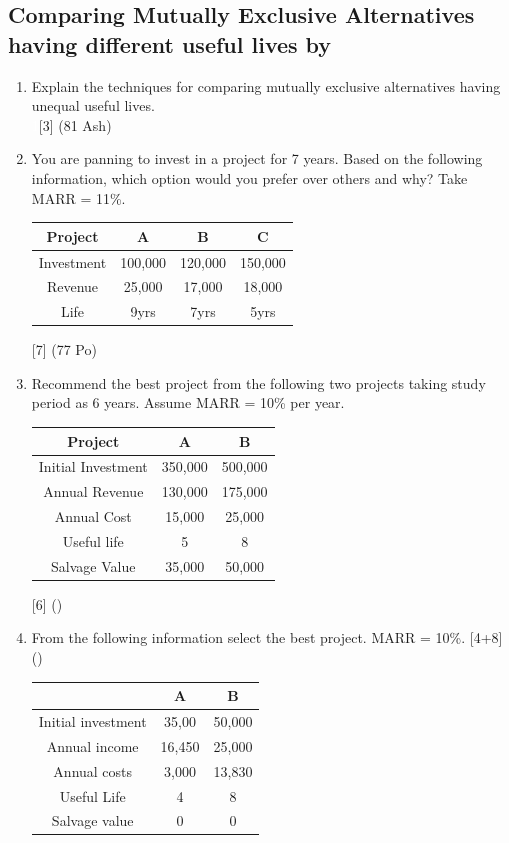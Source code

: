 \documentclass[12pt]{article}
\newcommand{\enter}{\\\textcolor{white}{1}}
\begin{document}
	\subsection{Comparing Mutually Exclusive Alternatives having different useful lives by}
	\begin{enumerate}[noitemsep, topsep = 0pt]
		\item Explain the techniques for comparing mutually exclusive alternatives having unequal useful lives. 
		\enter\hfill [3] (81 Ash)
		
		\item You are panning to invest in a project for 7 years. Based on the following information, which option would you prefer over others and why? Take MARR = 11\%. \\
		\begin{tabular}{|c|c|c|c|}
			\hline
			Project & A & B & C \\ \hline
			Investment & 100,000 & 120,000 & 150,000 \\ \hline
			Revenue & 25,000 & 17,000 & 18,000 \\ \hline
			Life & 9yrs & 7yrs & 5yrs \\ \hline
		\end{tabular}\hfill [7] (77 Po)
		
		\item Recommend the best project from the following two projects taking study period as 6 years. Assume MARR = 10\% per year.\\
		\begin{tabular}{|c|c|c|}
			\hline
			Project & A & B \\ \hline
			Initial Investment & 350,000 & 500,000 \\ \hline
			Annual Revenue & 130,000 & 175,000 \\ \hline
			Annual Cost & 15,000 & 25,000 \\ \hline
			Useful life & 5 & 8 \\ \hline
			Salvage Value & 35,000 & 50,000 \\ \hline
		\end{tabular}\hfill [6] ()
		
		\item From the following information select the best project. MARR = 10\%. \hfill [4+8] ()
		\begin{tabular}{|c|c|c|}
			\hline
			& A & B \\ \hline
			Initial investment & 35,00 & 50,000 \\ \hline
			Annual income & 16,450 & 25,000 \\ \hline
			Annual costs & 3,000 & 13,830 \\ \hline
			Useful Life & 4 & 8 \\ \hline
			Salvage value & 0 & 0 \\ \hline
		\end{tabular}
		

\end{enumerate}
\end{document}
